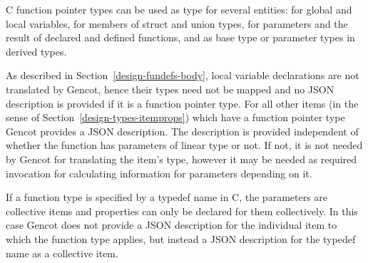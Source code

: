 C function pointer types can be used as type for several entities: for global and local variables, for members of struct
and union types, for parameters and the result of declared and defined functions, and as base type or parameter 
types in derived types.

As described in Section~\ref{design-fundefs-body}, local variable declarations are not translated by Gencot, hence
their types need not be mapped and no JSON description is provided if it is a function pointer type. 
For all other items (in the sense of Section~\ref{design-types-itemprops}) which have a function pointer type Gencot 
provides a JSON description. The
description is provided independent of whether the function has parameters of linear type or not. If not, it is
not needed by Gencot for translating the item's type, however it may be needed as required invocation for
calculating information for parameters depending on it.

If a function type is specified by a typedef name in C, the parameters are collective items and properties can only 
be declared for them collectively. In this case Gencot does not provide a JSON description for the individual
item to which the function type applies, but instead a JSON description for the typedef name as a collective item.


